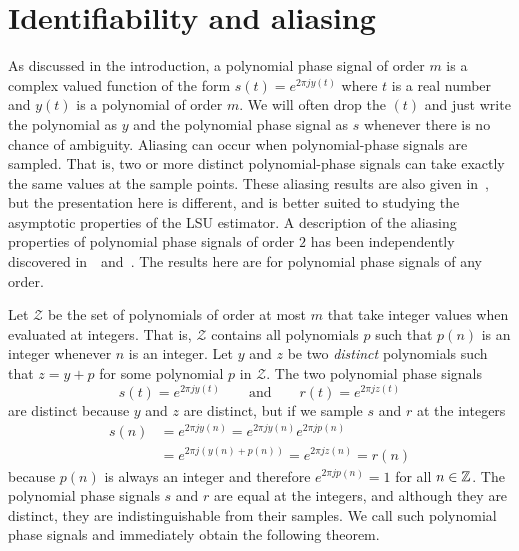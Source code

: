 \documentclass[journal]{IEEEtran}
\begin{document}
\section{Identifiability and aliasing}\label{sec:ident_aliasing}

As discussed in the introduction, a polynomial phase signal of order $m$ is a complex valued function of the form $s(t) = e^{2\pi j y(t)}$ where $t$ is a real number and $y(t)$ is a polynomial of order $m$. We will often drop the $(t)$ and just write the polynomial as $y$ and the polynomial phase signal as $s$ whenever there is no chance of ambiguity. %
Aliasing can occur when polynomial-phase signals are sampled.  That is, two or more distinct polynomial-phase signals can take exactly the same values at the sample points.  These aliasing results are also given in~\cite{McKilliam2009IndentifiabliltyAliasingPolyphase}, but the presentation here is different, and is better suited to studying the asymptotic properties of the LSU estimator.  A description of the aliasing properties of polynomial phase signals of order $2$ has been independently discovered in~\cite{Abatzoglou_ml_chirp_1986}~and~\cite{Angeby_PPS_aliasing_2000}.  The results here are for polynomial phase signals of any order.

Let $\mathcal{Z}$ be the set of polynomials of order at most $m$ that take integer values when evaluated at integers. That is, $\mathcal{Z}$ contains all polynomials $p$ such that $p(n)$ is an integer whenever $n$ is an integer.
Let $y$ and $z$ be two \emph{distinct} polynomials such that $z = y + p$ for some polynomial $p$ in $\mathcal{Z}$. The two polynomial phase signals
\[
s(t) = e^{2\pi j y(t)} \qquad \text{and} \qquad r(t) = e^{2\pi j z(t)}
\]
are distinct because $y$ and $z$ are distinct, but if we sample $s$ and $r$ at the integers  
\begin{align*}
s(n) &= e^{2\pi j y(n)} =  e^{2\pi j y(n)} e^{2\pi j p(n)} \\
&= e^{2\pi j (y(n) + p(n))} = e^{2\pi j z(n)} = r(n)
\end{align*}
because $p(n)$ is always an integer and therefore $e^{2\pi j p(n)} = 1$ for all $n \in {\mathbb Z}$. The polynomial phase signals $s$ and $r$ are equal at the integers, and although they are distinct, they are indistinguishable from their samples. We call such polynomial phase signals  and immediately obtain the following theorem.
\end{document}

